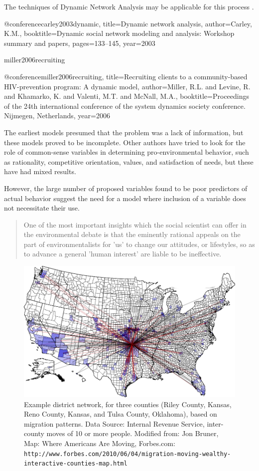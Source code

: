The techniques of Dynamic Network Analysis may be applicable for this process \citep{carley2003dynamic}.

@conference{carley2003dynamic,
  title={{Dynamic network analysis}},
  author={Carley, K.M.},
  booktitle={Dynamic social network modeling and analysis: Workshop summary and papers},
  pages={133--145},
  year={2003}
}

miller2006recruiting

@conference{miller2006recruiting,
  title={{Recruiting clients to a community-based HIV-prevention program: A dynamic model}},
  author={Miller, R.L. and Levine, R. and Khamarko, K. and Valenti, M.T. and McNall, M.A.},
  booktitle={Proceedings of the 24th international conference of the system dynamics society conference. Nijmegen, Netherlands},
  year={2006}
}

The earliest models presumed that the problem was a lack of information, but these models proved to be incomplete.  Other authors have tried to look for the role of common-sense variables in determining pro-environmental behavior, such as rationality, competitive orientation, values, and satisfaction of needs, but these have had mixed results.

However, the large number of proposed variables found to be poor predictors of actual behavior suggest the need for a model where inclusion of a variable does not necessitate their use.

\begin{quotation}
One of the most important insights which the social scientist can offer in the environmental debate is that the eminently rational appeals on the part of environmentalists for 'us' to change our attitudes, or lifestyles, so as to advance a general 'human interest' are liable to be ineffective.
\end{quotation}

\begin{figure}[htb]
\includegraphics[width=6in]{districtnetwork2.png}
\caption{Example district network, for three counties (Riley County, Kansas, Reno County, Kansas, and Tulsa County, Oklahoma), based on migration patterns.  {\footnotesize Data Source: Internal Revenue Service, inter-county moves of 10 or more people.  Modified from: Jon Bruner, Map: Where Americans Are Moving, Forbes.com: {\tt http://www.forbes.com/2010/06/04/migration-moving-wealthy-interactive-counties-map.html}}}
\end{figure}

